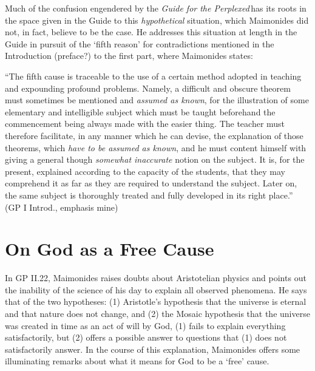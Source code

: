 \documentclass[12pt]{article}
\newcommand{\GP}{the \emph{Guide for the Perplexed}\,}
\begin{document}
Much of the confusion engendered by \GP has its roots in the space given in the Guide to this \emph{hypothetical} situation, which Maimonides did not, in fact, believe to be the case. He addresses this situation at length in the Guide in pursuit of the `fifth reason' for contradictions mentioned in the Introduction (preface?) to the first part, where Maimonides states:
\begin{displayquote}
``The fifth cause is traceable to the use of a certain method adopted in teaching and expounding profound problems. Namely, a difficult and obscure theorem must sometimes be mentioned and \emph{assumed as known}, for the illustration of some elementary and intelligible subject which must be taught beforehand the commencement being always made with the easier thing. The teacher must therefore facilitate, in any manner which he can devise, the explanation of those theorems, which \emph{have to be assumed as known}, and he must content himself with giving a general though \emph{somewhat inaccurate} notion on the subject. It is, for the present, explained according to the capacity of the students, that they may comprehend it as far as they are required to understand the subject. Later on, the same subject is thoroughly treated and fully developed in its right place.''\\ \phantom{a} \hfill (GP I Introd., emphasis mine)
\end{displayquote}

\newpage

\section*{On God as a Free Cause}

In GP II.22, Maimonides raises doubts about Aristotelian physics and points out the inability of the science of his day to explain all observed phenomena. He says that of the two hypotheses: (1) Aristotle's hypothesis that the universe is eternal and that nature does not change, and (2) the Mosaic hypothesis that the universe was created in time as an act of will by God, (1) fails to explain everything satisfactorily, but (2) offers a possible answer to questions that (1) does not satisfactorily answer. In the course of this explanation, Maimonides offers some illuminating remarks about what it means for God to be a `free' cause.
\end{document}
